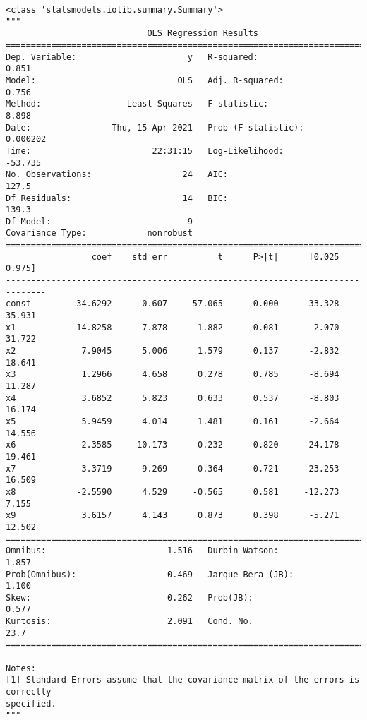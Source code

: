 \documentclass[11pt]{ctexart}
\makeatletter
\newcommand{\boxspacing}{\kern\kvtcb@left@rule\kern\kvtcb@boxsep}
\newcommand{\prompt}[4]{
        {\ttfamily\llap{{\color{#2}[#3]:\hspace{3pt}#4}}\vspace{-\baselineskip}}
    }
\makeatother
\begin{document}
            \begin{tcolorbox}[breakable, size=fbox, boxrule=.5pt, pad at break*=1mm, opacityfill=0]
\prompt{Out}{outcolor}{4}{\boxspacing}
\begin{Verbatim}[commandchars=\\\{\}]
<class 'statsmodels.iolib.summary.Summary'>
"""
                            OLS Regression Results
==============================================================================
Dep. Variable:                      y   R-squared:                       0.851
Model:                            OLS   Adj. R-squared:                  0.756
Method:                 Least Squares   F-statistic:                     8.898
Date:                Thu, 15 Apr 2021   Prob (F-statistic):           0.000202
Time:                        22:31:15   Log-Likelihood:                -53.735
No. Observations:                  24   AIC:                             127.5
Df Residuals:                      14   BIC:                             139.3
Df Model:                           9
Covariance Type:            nonrobust
==============================================================================
                 coef    std err          t      P>|t|      [0.025      0.975]
------------------------------------------------------------------------------
const         34.6292      0.607     57.065      0.000      33.328      35.931
x1            14.8258      7.878      1.882      0.081      -2.070      31.722
x2             7.9045      5.006      1.579      0.137      -2.832      18.641
x3             1.2966      4.658      0.278      0.785      -8.694      11.287
x4             3.6852      5.823      0.633      0.537      -8.803      16.174
x5             5.9459      4.014      1.481      0.161      -2.664      14.556
x6            -2.3585     10.173     -0.232      0.820     -24.178      19.461
x7            -3.3719      9.269     -0.364      0.721     -23.253      16.509
x8            -2.5590      4.529     -0.565      0.581     -12.273       7.155
x9             3.6157      4.143      0.873      0.398      -5.271      12.502
==============================================================================
Omnibus:                        1.516   Durbin-Watson:                   1.857
Prob(Omnibus):                  0.469   Jarque-Bera (JB):                1.100
Skew:                           0.262   Prob(JB):                        0.577
Kurtosis:                       2.091   Cond. No.                         23.7
==============================================================================

Notes:
[1] Standard Errors assume that the covariance matrix of the errors is correctly
specified.
"""
\end{Verbatim}
\end{tcolorbox}
        
\end{document}
